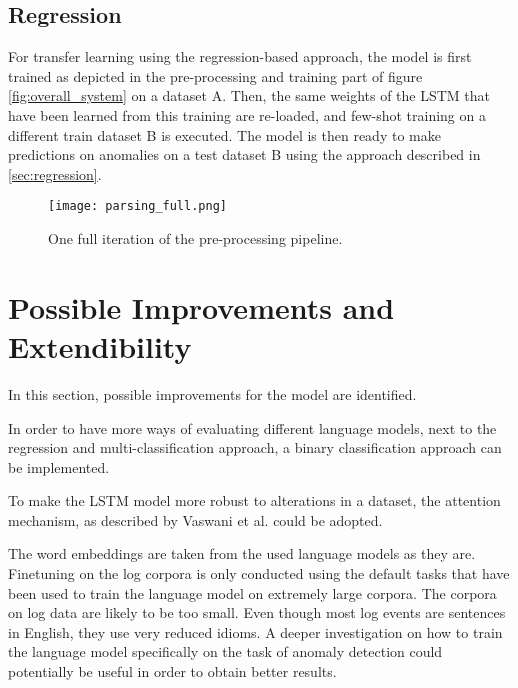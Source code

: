 \subsection{Regression \label{sec:transfer_regression}}
For transfer learning using the regression-based approach, the model is first trained as depicted in the pre-processing and training part of figure \ref{fig:overall_system} on a dataset A. Then, the same weights of the LSTM that have been learned from this training are re-loaded, and few-shot training on a different train dataset B is executed. The model is then ready to make predictions on anomalies on a test dataset B using the approach described in \ref{sec:regression}.



\begin{figure}[htb]
  \centering
  \texttt{[image: parsing\_full.png]}\\
  \caption{One full iteration of the pre-processing pipeline.}
  \label{fig:full_preprocessing_pipeline}
\end{figure}


\section{Possible Improvements and Extendibility\label{sec:improvements}}
In this section, possible improvements for the model are identified. 

In order to have more ways of evaluating different language models, next to the regression and multi-classification approach, a binary classification approach can be implemented.

To make the LSTM model more robust to alterations in a dataset, the attention mechanism, as described by Vaswani et al. \cite{vaswani2017attention} could be adopted.

The word embeddings are taken from the used language models as they are. Finetuning on the log corpora is only conducted using the default tasks that have been used to train the language model on extremely large corpora. The corpora on log data are likely to be too small. Even though most log events are sentences in English, they use very reduced idioms. A deeper investigation on how to train the language model specifically on the task of anomaly detection could potentially be useful in order to obtain better results.





